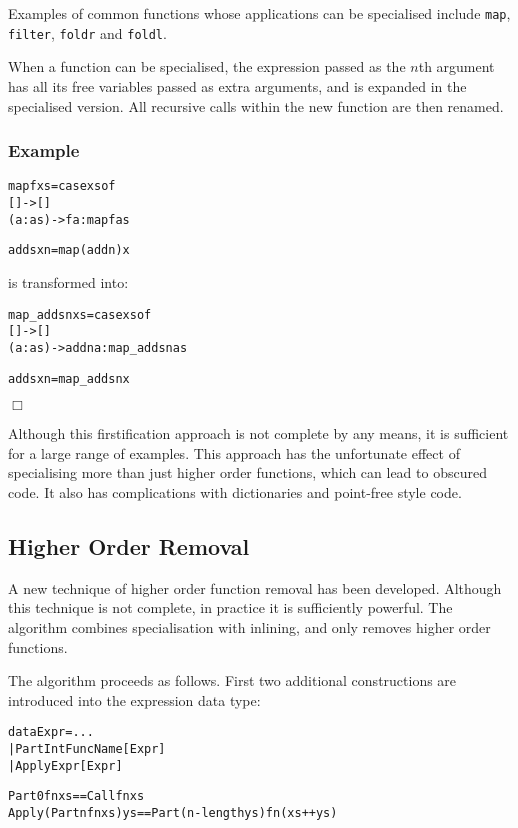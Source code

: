 \documentclass[preprint]{sigplanconf}
\newcommand{\T}[1]{\texttt{#1}}
\newcounter{exmp}
\newcommand{\yesexample}{\subsubsection*{Example \arabic{exmp}}\addtocounter{exmp}{1}}
\newcommand{\noexample}{\hfill$\Box$}
\newenvironment{code}{\begin{alltt}\small}{\end{alltt}}
\begin{document}
Examples of common functions whose applications can be specialised include \T{map}, \T{filter}, \T{foldr} and \T{foldl}.

When a function can be specialised, the expression passed as the $n$th argument has all its free variables passed as extra arguments, and is expanded in the specialised version. All recursive calls within the new function are then renamed.

\yesexample

\begin{code}
map f xs = case  xs of
                 []      -> []
                 (a:as)  -> f a : map f as

adds x n = map (add n) x
\end{code}

\noindent is transformed into:

\begin{code}
map_adds n xs = case  xs of
                      []      -> []
                      (a:as)  -> add n a : map_adds n as

adds x n = map_adds n x
\end{code}\noexample

Although this firstification approach is not complete by any means, it is sufficient for a large range of examples. This approach has the unfortunate effect of specialising more than just higher order functions, which can lead to obscured code. It also has complications with dictionaries and point-free style code.

\subsection{Higher Order Removal}

A new technique of higher order function removal has been developed. Although this technique is not complete, in practice it is sufficiently powerful. The algorithm combines specialisation with inlining, and only removes higher order functions.

The algorithm proceeds as follows. First two additional constructions are introduced into the expression data type:

\begin{code}
data Expr  =  ...
           |  Part Int FuncName [Expr]
           |  Apply Expr [Expr]

Part 0 fn xs == Call fn xs
Apply (Part n fn xs) ys == Part (n - length ys) fn (xs ++ ys)
\end{code}
\end{document}
